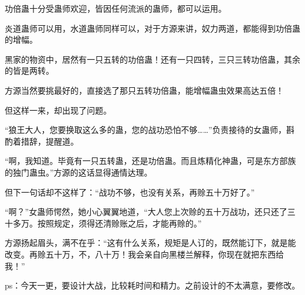 \begin{this_body}
功倍蛊十分受蛊师欢迎，皆因任何流派的蛊师，都可以运用。

炎道蛊师可以用，水道蛊师同样可以，对于方源来讲，奴力两道，都能得到功倍蛊的增幅。

黑家的物资中，居然有一只五转的功倍蛊！还有一只四转，三只三转功倍蛊，其余的皆是两转。

方源当然要挑最好的，直接选了那只五转功倍蛊，能增幅蛊虫效果高达五倍！

但这样一来，却出现了问题。

“狼王大人，您要换取这么多的蛊，您的战功恐怕不够……”负责接待的女蛊师，斟酌着措辞，提醒道。

“啊，我知道。毕竟有一只五转蛊，还是功倍蛊。而且炼精化神蛊，可是东方部族的独门蛊虫。”方源的这话显得通情达理。

但下一句话却不这样了：“战功不够，也没有关系，再赊五十万好了。”

“啊？”女蛊师愕然，她小心翼翼地道，“大人您上次赊的五十万战功，还只还了三十多万。按照规定，须得还清赊账之后，才能再赊的。”

方源扬起眉头，满不在乎：“这有什么关系，规矩是人订的，既然能订下，就是能改变。再赊五十万，不，八十万！我会亲自向黑楼兰解释，你现在就把东西给我！”

ps：今天一更，要设计大战，比较耗时间和精力。之前设计的不太满意，要修改。

\end{this_body}

